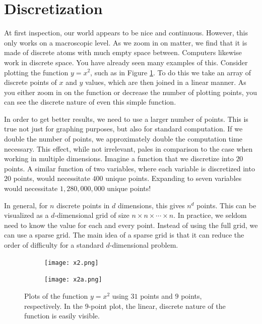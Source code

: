\label{lab:spgrid}


\section*{Discretization}
At first inspection, our world appears to be nice and continuous.  However, this only works on a macroscopic level.  As we zoom in on matter, we find that it is made of discrete atoms with much empty space between.  Computers likewise work in discrete space.  You have already seen many examples of this.  Consider plotting the function $y=x^2$, such as in Figure \ref{fig:x_squared}.  To do this we take an array of discrete points of $x$ and $y$ values, which are then joined in a linear manner.  As you either zoom in on the function or decrease the number of plotting points, you can see the discrete nature of even this simple function.

In order to get better results, we need to use a larger number of points.  This is true not just for graphing purposes, but also for standard computation.  If we double the number of points, we approximately double the computation time necessary.  This effect, while not irrelevant, pales in comparison to the case when working in multiple dimensions.  Imagine a function that we discretize into $20$ points.  A similar function of two variables, where each variable is discretized into $20$ points, would necessitate $400$ unique points.  Expanding to seven variables would necessitate $1,280,000,000$ unique points!

In general, for $n$ discrete points in $d$ dimensions, this gives $n^d$ points.  This can be visualized as a $d$-dimensional grid of size $n \times n \times \cdots \times n$. In practice, we seldom need to know the value for each and every point.  Instead of using the full grid, we can use a sparse grid.  The main idea of a sparse grid is that it can reduce the order of difficulty for a standard $d$-dimensional problem.

\begin{center}
\begin{figure}
\begin{subfigure}{.49\textwidth}
\texttt{[image: x2.png]}
\end{subfigure}
\begin{subfigure}{.49\textwidth}
\texttt{[image: x2a.png]}
\end{subfigure}
\caption{Plots of the function $y=x^2$ using $31$ points and $9$ points, respectively.  In the $9$-point plot, the linear, discrete nature of the function is easily visible.}
\label{fig:x_squared}
\end{figure}
\end{center}

